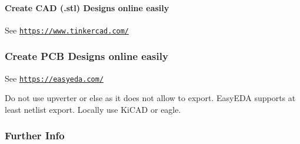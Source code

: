 \paragraph*{Create C\-A\-D (.stl) Designs online easily}

See \href{https://www.tinkercad.com/}{\tt https\-://www.\-tinkercad.\-com/}

\subsubsection*{Create P\-C\-B Designs online easily}

See \href{https://easyeda.com/}{\tt https\-://easyeda.\-com/}

Do not use upverter or else as it does not allow to export. Easy\-E\-D\-A supports at least netlist export. Locally use Ki\-C\-A\-D or eagle.

\subsubsection*{Further Info}


